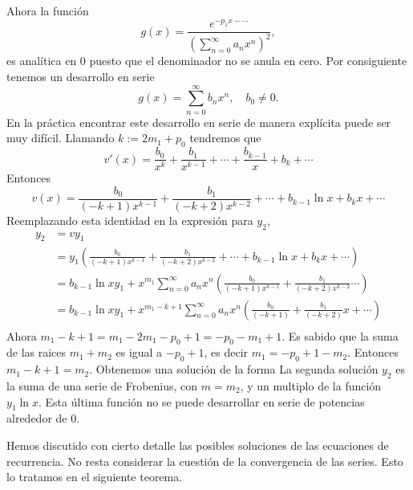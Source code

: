 \documentclass{article}
\newcounter{teor_cont}
\begin{document}
Ahora la función
\[
  g(x)= \frac{ e^{ -p_1x-\cdots } }{\left(\sum_{n=0}^{\infty}a_nx^n\right)^2},
\]
es analítica en $0$ puesto que el denominador no se anula en cero. Por consiguiente tenemos un desarrollo en serie
\[ g(x)=\sum_{n=0}^{\infty}b_nx^n, \quad b_0\neq 0.\]
En la práctica encontrar este desarrollo en serie de manera explícita puede ser muy difícil. Llamando $k:=2m_1+p_0$ tendremos que
\[v'(x)=\frac{b_0}{x^k}+ \frac{b_1}{x^{k-1}}+\cdots+\frac{b_{k-1}}{x}+b_{k}+\cdots\]
Entonces
\[v(x)=\frac{b_0}{(-k+1)x^{k-1}}+ \frac{b_1}{(-k+2)x^{k-2}}+\cdots+b_{k-1}\ln x+b_{k}x+\cdots\]
Reemplazando esta identidad en la expresión para $y_2$,
\[
   \begin{split}
     y_2&=vy_1\\
&=y_1\left(\frac{b_0}{(-k+1)x^{k-1}}+ \frac{b_1}{(-k+2)x^{k-2}}+\cdots+b_{k-1}\ln x+b_{k}x+\cdots\right)\\
       &=b_{k-1}\ln x y_1+ x^{m_1}\sum_{n=0}^{\infty}a_nx^n\left(\frac{b_0}{(-k+1)x^{k-1}}+ \frac{b_1}{(-k+2)x^{k-2}}\cdots\right)\\
       &=b_{k-1}\ln x y_1+ x^{m_1-k+1}\sum_{n=0}^{\infty}a_nx^n\left(\frac{b_0}{(-k+1)}+ \frac{b_1}{(-k+2)}x+\cdots\right)\\
   \end{split}
\]
Ahora $m_1-k+1=m_1-2m_1-p_0+1=-p_0-m_1+1$. Es sabido que la suma de las raices $m_1+m_2$ es igual a $-p_0+1$, es decir $m_1=-p_0+1-m_2$. Entonces $m_1-k+1=m_2$. Obtenemos una solución de la forma
La segunda solución $y_2$ es la suma de una serie de Frobenius, con $m=m_2$, y un multiplo de la función $y_1\ln x$. Esta última función no se puede desarrollar en serie de potencias alrededor de $0$.

Hemos discutido con cierto detalle las posibles soluciones de las ecuaciones de recurrencia. No resta considerar la cuestión de la convergencia de las series. Esto lo tratamos en el siguiente teorema. 
\end{document}
